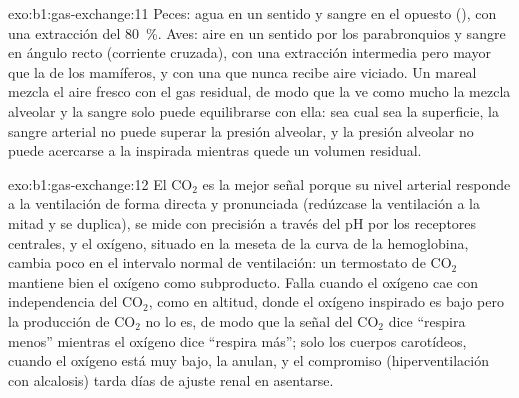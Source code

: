 \begin{solution}{exo:b1:gas-exchange:11}
Peces: agua en un sentido y sangre en el opuesto (), con una
extracción del \qty{80}{\%}. Aves: aire en un sentido por los parabronquios
y sangre en ángulo recto (corriente cruzada), con una extracción intermedia
pero mayor que la de los mamíferos, y con una  que
nunca recibe aire viciado. Un  mareal mezcla el aire fresco con el gas
residual, de modo que la  ve como mucho la mezcla
alveolar y la sangre solo puede equilibrarse con ella: sea cual sea la
superficie, la sangre arterial no puede superar la presión alveolar, y la
presión alveolar no puede acercarse a la inspirada mientras quede un volumen
residual.
\end{solution}

\begin{solution}{exo:b1:gas-exchange:12}
El $\mathrm{CO_2}$ es la mejor señal porque su nivel arterial responde a la
ventilación de forma directa y pronunciada (redúzcase la ventilación a la
mitad y se duplica), se mide con precisión a través del pH por los
receptores centrales, y el oxígeno, situado en la meseta de la curva de la
hemoglobina, cambia poco en el intervalo normal de ventilación: un termostato
de $\mathrm{CO_2}$ mantiene bien el oxígeno como subproducto. Falla cuando
el oxígeno cae con independencia del $\mathrm{CO_2}$, como en altitud, donde
el oxígeno inspirado es bajo pero la producción de $\mathrm{CO_2}$ no lo es,
de modo que la señal del $\mathrm{CO_2}$ dice ``respira menos'' mientras el
oxígeno dice ``respira más''; solo los cuerpos carotídeos, cuando el oxígeno
está muy bajo, la anulan, y el compromiso (hiperventilación con alcalosis)
tarda días de ajuste renal en asentarse.
\end{solution}

